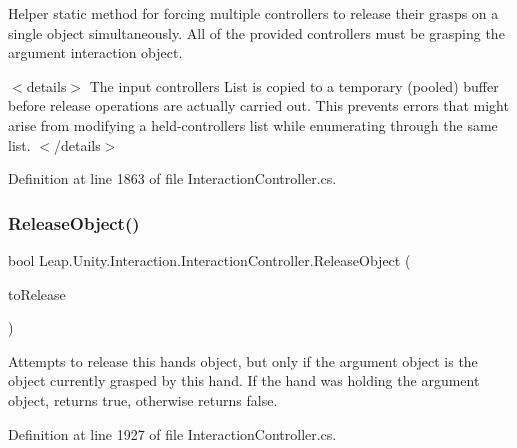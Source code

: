 Helper static method for forcing multiple controllers to release their grasps on a single object simultaneously. All of the provided controllers must be grasping the argument interaction object. 

$<$details$>$ The input controllers List is copied to a temporary (pooled) buffer before release operations are actually carried out. This prevents errors that might arise from modifying a held-\/controllers list while enumerating through the same list. $<$/details$>$ 

Definition at line 1863 of file Interaction\+Controller.\+cs.

\mbox{\label{class_leap_1_1_unity_1_1_interaction_1_1_interaction_controller_afcd8f7927d59f8dfd8a022c2d4dea11a}} 
\subsubsection{\texorpdfstring{ReleaseObject()}{ReleaseObject()}}
{\footnotesize\ttfamily bool Leap.\+Unity.\+Interaction.\+Interaction\+Controller.\+Release\+Object (\begin{DoxyParamCaption}\item[{\mbox{\hyperlink{interface_leap_1_1_unity_1_1_interaction_1_1_i_interaction_behaviour}{I\+Interaction\+Behaviour}}}]{to\+Release }\end{DoxyParamCaption})}



Attempts to release this hand\textquotesingle{}s object, but only if the argument object is the object currently grasped by this hand. If the hand was holding the argument object, returns true, otherwise returns false. 



Definition at line 1927 of file Interaction\+Controller.\+cs.

\mbox{\label{class_leap_1_1_unity_1_1_interaction_1_1_interaction_controller_a593d87fbcfe464b2308a56a60b4796d5}} 
